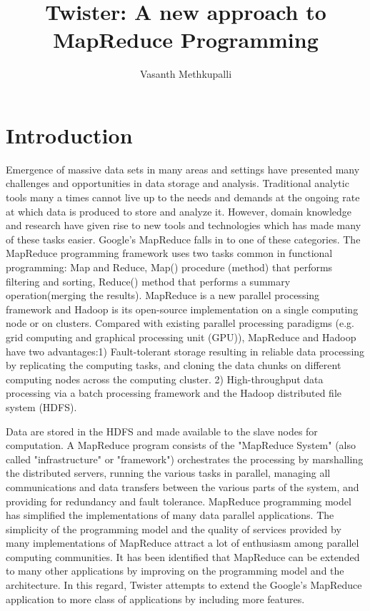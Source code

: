 \documentclass[9pt,twocolumn,twoside]{../../styles/osajnl}
\title{Twister: A new approach to MapReduce Programming}
\author[1,*]{Vasanth Methkupalli}
\affil[1]{School of Informatics and Computing, Bloomington, IN 47408, U.S.A.}
\affil[*]{Corresponding authors: mvasanthiiit@gmail.com}
\begin{document}
\maketitle

\section{Introduction}

Emergence of massive data sets in many areas and settings have
presented many challenges and opportunities in data storage and
analysis\cite{dean2008mapreduce}\cite{mohebi2016iterative}. Traditional
analytic tools many a times cannot live up to the needs and demands at
the ongoing rate at which data is produced to store and analyze
it\cite{lee2012parallel}. However, domain knowledge and research have
given rise to new tools and technologies which has made many of these
tasks easier\cite{zaharia2010spark}. Google’s MapReduce falls in to
one of these categories. The MapReduce programming framework uses two
tasks common in functional programming: Map and Reduce, Map()
procedure (method) that performs filtering and sorting, Reduce()
method that performs a summary operation(merging the
results)\cite{wikipedia}\cite{mohammed2014applications}. MapReduce is
a new parallel processing framework and Hadoop is its open-source
implementation on a single computing node or on clusters. Compared
with existing parallel processing paradigms (e.g. grid computing and
graphical processing unit (GPU)), MapReduce and Hadoop have two
advantages:1) Fault-tolerant storage resulting in reliable data
processing by replicating the computing tasks, and cloning the data
chunks on different computing nodes across the computing cluster. 2)
High-throughput data processing via a batch processing framework and
the Hadoop distributed file system
(HDFS)\cite{elsayed2014mapreduce}\cite{ekanayake2010twister}\cite{lee2012parallel}.


Data are stored in the HDFS and made available to the slave nodes for
computation. A MapReduce program consists of the "MapReduce System"
(also called "infrastructure" or "framework") orchestrates the
processing by marshalling the distributed servers, running the various
tasks in parallel, managing all communications and data transfers
between the various parts of the system, and providing for redundancy
and fault tolerance\cite{mohammed2014applications}. MapReduce
programming model has simplified the implementations of many data
parallel applications\cite{lee2012parallel}. The simplicity of the
programming model and the quality of services provided by many
implementations of MapReduce attract a lot of enthusiasm among
parallel computing
communities\cite{ekanayake2010twister}\cite{grolinger2014challenges}. It
has been identified that MapReduce can be extended to many other
applications by improving on the programming model and the
architecture. In this regard, Twister attempts to extend the Google’s
MapReduce application to more class of applications by including more
features\cite{twister}\cite{doulkeridis2014survey}.
\end{document}
